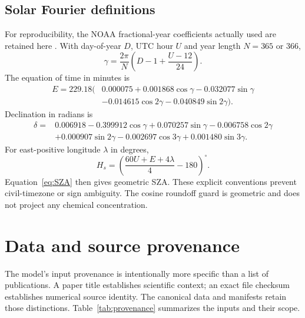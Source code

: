 \section{Solar Fourier definitions}
For reproducibility, the NOAA fractional-year coefficients actually used are retained here \citep{noaa}. With day-of-year $D$, UTC hour $U$ and year length $N=365$ or 366,
\begin{equation}\gamma=\frac{2\pi}{N}\left(D-1+\frac{U-12}{24}\right).\end{equation}
The equation of time in minutes is
\begin{align}
E=229.18\bigl(&0.000075+0.001868\cos\gamma-0.032077\sin\gamma\nonumber\\
&-0.014615\cos2\gamma-0.040849\sin2\gamma\bigr).
\end{align}
Declination in radians is
\begin{align}
\delta={}&0.006918-0.399912\cos\gamma+0.070257\sin\gamma
-0.006758\cos2\gamma\nonumber\\
&+0.000907\sin2\gamma-0.002697\cos3\gamma+0.001480\sin3\gamma.
\end{align}
For east-positive longitude $\lambda$ in degrees,
\begin{equation}H_s=\left(\frac{60U+E+4\lambda}{4}-180\right)^\circ.\end{equation}
Equation~\eqref{eq:SZA} then gives geometric SZA. These explicit conventions prevent civil-timezone or sign ambiguity. The cosine roundoff guard is geometric and does not project any chemical concentration.

\chapter{Data and source provenance}\label{app:data}
The model's input provenance is intentionally more specific than a list of publications. A paper title establishes scientific context; an exact file checksum establishes numerical source identity. The canonical data and manifests retain those distinctions. Table~\ref{tab:provenance} summarizes the inputs and their scope.

